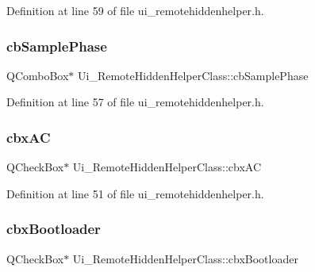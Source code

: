 Definition at line 59 of file ui\+\_\+remotehiddenhelper.\+h.

\hypertarget{class_ui___remote_hidden_helper_class_ae3964614499043876a7a8bc28130fb94}{}\label{class_ui___remote_hidden_helper_class_ae3964614499043876a7a8bc28130fb94} 
\subsubsection{\texorpdfstring{cb\+Sample\+Phase}{cbSamplePhase}}
{\footnotesize\ttfamily Q\+Combo\+Box$\ast$ Ui\+\_\+\+Remote\+Hidden\+Helper\+Class\+::cb\+Sample\+Phase}



Definition at line 57 of file ui\+\_\+remotehiddenhelper.\+h.

\hypertarget{class_ui___remote_hidden_helper_class_ad0546671fd7bf35b31518d5dcb721664}{}\label{class_ui___remote_hidden_helper_class_ad0546671fd7bf35b31518d5dcb721664} 
\subsubsection{\texorpdfstring{cbx\+AC}{cbxAC}}
{\footnotesize\ttfamily Q\+Check\+Box$\ast$ Ui\+\_\+\+Remote\+Hidden\+Helper\+Class\+::cbx\+AC}



Definition at line 51 of file ui\+\_\+remotehiddenhelper.\+h.

\hypertarget{class_ui___remote_hidden_helper_class_a6caf14f533d691c1245bf2a152a4e742}{}\label{class_ui___remote_hidden_helper_class_a6caf14f533d691c1245bf2a152a4e742} 
\subsubsection{\texorpdfstring{cbx\+Bootloader}{cbxBootloader}}
{\footnotesize\ttfamily Q\+Check\+Box$\ast$ Ui\+\_\+\+Remote\+Hidden\+Helper\+Class\+::cbx\+Bootloader}



